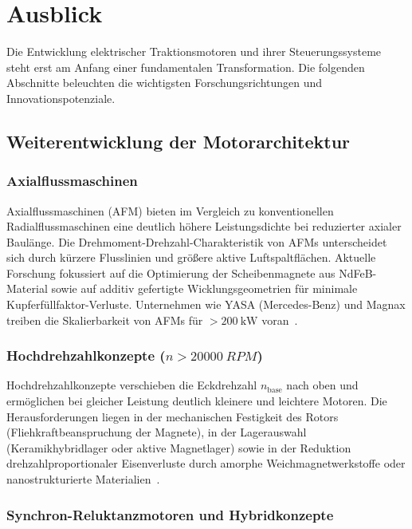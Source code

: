 ﻿\documentclass[a4paper,12pt]{article}
\theoremstyle{definition}
\begin{document}
\section{Ausblick}
\label{sec:ausblick}

Die Entwicklung elektrischer Traktionsmotoren und ihrer Steuerungssysteme steht
erst am Anfang einer fundamentalen Transformation. Die folgenden Abschnitte
beleuchten die wichtigsten Forschungsrichtungen und Innovationspotenziale.

\subsection{Weiterentwicklung der Motorarchitektur}

\subsubsection{Axialflussmaschinen}

Axialflussmaschinen (AFM) bieten im Vergleich zu konventionellen Radialflussmaschinen
eine deutlich höhere Leistungsdichte bei reduzierter axialer Baulänge. Die
Drehmoment-Drehzahl-Charakteristik von AFMs unterscheidet sich durch kürzere
Flusslinien und größere aktive Luftspaltflächen. Aktuelle Forschung fokussiert
auf die Optimierung der Scheibenmagnete aus NdFeB-Material sowie auf
additiv gefertigte Wicklungsgeometrien für minimale Kupferfüllfaktor-Verluste.
Unternehmen wie YASA (Mercedes-Benz) und Magnax treiben die Skalierbarkeit von
AFMs für $>\SI{200}{\kilo\watt}$ voran~\cite{chalmers2011axial}.

\subsubsection{Hochdrehzahlkonzepte ($n > \SI{20000}{RPM}$)}

Hochdrehzahlkonzepte verschieben die Eckdrehzahl $n_{\mathrm{base}}$ nach oben
und ermöglichen bei gleicher Leistung deutlich kleinere und leichtere Motoren.
Die Herausforderungen liegen in der mechanischen Festigkeit des Rotors
(Fliehkraftbeanspruchung der Magnete), in der Lagerauswahl (Keramikhybridlager
oder aktive Magnetlager) sowie in der Reduktion drehzahlproportionaler
Eisenverluste durch amorphe Weichmagnetwerkstoffe oder nanostrukturierte
Materialien~\cite{gerada2014high}.

\subsubsection{Synchron-Reluktanzmotoren und Hybridkonzepte}
\end{document}
